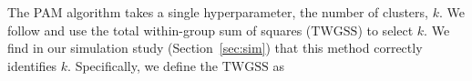 \documentclass[12pt,compact]{article}
\newcommand{\JSGa}{\mathop{\mathrm{JS}^{\mathrm{G}_{\lambda}}}\nolimits}
\begin{document}

The PAM algorithm takes a single hyperparameter, the number of clusters, $k$.
We follow \citet{Thorndike1953-ie} and use the total within-group sum of squares ($\mathrm{TWGSS}$) to select $k$.
We find in our simulation study (Section~\ref{sec:sim}) that this method correctly identifies $k$. %
Specifically, we define the $\mathrm{TWGSS}$ as
\end{document}

